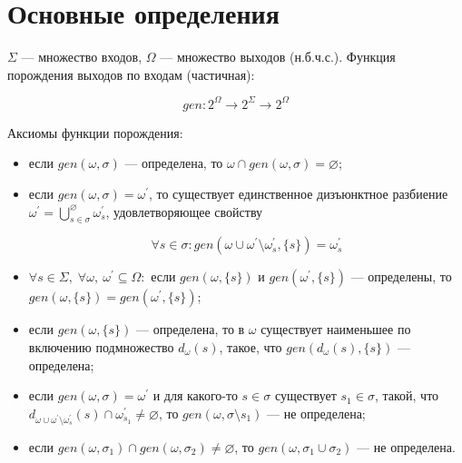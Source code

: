 \section{Основные определения}

$\Sigma$ --- множество входов, $\Omega$ --- множество выходов (н.б.ч.с.). Функция порождения
выходов по входам (частичная):

$$
gen : 2^\Omega\to 2^\Sigma\to 2^\Omega
$$

Аксиомы функции порождения:

\begin{itemize}
	\item если $gen(\omega,\sigma)$ --- определена, то $\omega\cap gen(\omega,\sigma)=\varnothing$;
	\item если $gen(\omega,\sigma)=\omega^\prime$, то существует единственное дизъюнктное разбиение $\omega^\prime=\bigcup^\varnothing_{s\in\sigma}\omega^\prime_s$, 
	удовлетворяющее свойству 

	$$\forall s\in\sigma : gen(\omega\cup\omega^\prime\setminus\omega^\prime_s,\{s\})=\omega^\prime_s$$

	\item $\forall s\in\Sigma,\; \forall\omega,\:\omega^\prime\subseteq\Omega:$ если $gen(\omega,\{s\})$ и $gen(\omega^\prime,\{s\})$ ---
	определены, то $gen(\omega,\{s\})=gen(\omega^\prime,\{s\})$;

	\item если $gen(\omega,\{s\})$ --- определена, то в $\omega$ существует наименьшее по включению подмножество $d_\omega(s)$, такое, что
	$gen(d_\omega(s), \{s\})$ --- определена;

	\item если $gen(\omega,\sigma)=\omega^\prime$ и для какого-то $s\in\sigma$ существует $s_1\in\sigma$, такой, что
	$d_{\omega\cup\omega^\prime\setminus\omega^\prime_s}(s) \cap \omega^\prime_{s_1}\ne\varnothing$, 
	то $gen(\omega,\sigma\setminus s_1)$ --- не определена;

	\item если $gen(\omega,\sigma_1)\cap gen(\omega,\sigma_2)\ne\varnothing$, то $gen(\omega,\sigma_1\cup\sigma_2)$ --- не определена.
\end{itemize}